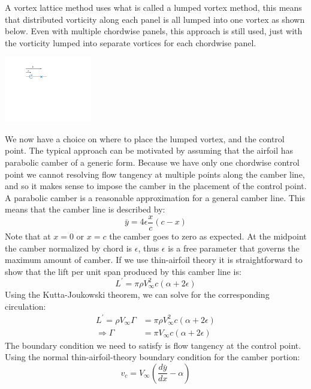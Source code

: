 \documentclass{article}
\begin{document}
A vortex lattice method uses what is called a lumped vortex method, this means that distributed vorticity along each panel is all lumped into one vortex as shown below.  Even with multiple chordwise panels, this approach is still used, just with the vorticity lumped into separate vortices for each chordwise panel.
\begin{center}
\includegraphics[width=1.5in]{figs/lumped-vortex}
\end{center}
We now have a choice on where to place the lumped vortex, and the control point.  The typical approach can be motivated by assuming that the airfoil has parabolic camber of a generic form.  Because we have only one chordwise control point we cannot resolving flow tangency at multiple points along the camber line, and so it makes sense to impose the camber in the placement of the control point.  A parabolic camber is a reasonable approximation for a general camber line.  This means that the camber line is described by:
\begin{equation}
\bar{y} = 4 \epsilon \frac{x}{c} (c - x)
\end{equation}
Note that at $x = 0$ or $x = c$ the camber goes to zero as expected.  At the midpoint the camber normalized by chord is $\epsilon$, thus $\epsilon$ is a free parameter that governs the maximum amount of camber.  If we use thin-airfoil theory it is straightforward to show that the lift per unit span produced by this camber line is:
\begin{equation}
L^\prime = \pi \rho V_\infty^2 c (\alpha + 2 \epsilon)
\end{equation}
Using the Kutta-Joukowski theorem, we can solve for the corresponding circulation:
\begin{align}
L^\prime = \rho V_\infty \Gamma &= \pi \rho V_\infty^2 c (\alpha + 2 \epsilon)\\
\Rightarrow \Gamma &= \pi V_\infty c (\alpha + 2 \epsilon)
\end{align}
The boundary condition we need to satisfy is flow tangency at the control point.  Using the normal thin-airfoil-theory boundary condition for the camber portion:
\begin{equation}
v_c = V_\infty \left(\frac{d\bar{y}}{dx} - \alpha \right)
\end{equation}
\end{document}
